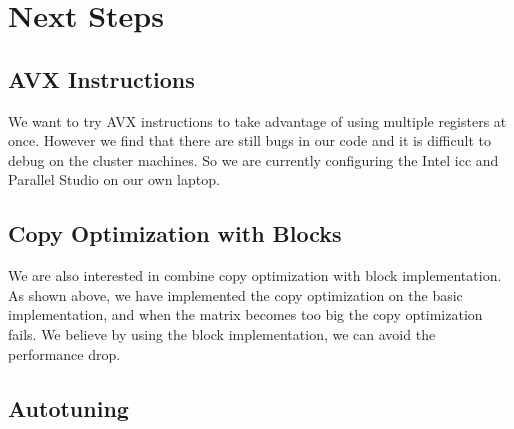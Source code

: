\documentclass[11pt]{article}
\theoremstyle{plain}
\theoremstyle{definition}
\begin{document}
\section{Next Steps}

\subsection{AVX Instructions}
We want to try AVX instructions to take advantage of using multiple registers at once. However we find that there are still bugs in our code and it is difficult to debug on the cluster machines. So we are currently configuring the Intel icc and Parallel Studio on our own laptop.

\subsection{Copy Optimization with Blocks}
We are also interested in combine copy optimization with block implementation. As shown above, we have implemented the copy optimization on the basic implementation, and when the matrix becomes too big the copy optimization fails. We believe by using the block implementation, we can avoid the performance drop.

\subsection{Autotuning}





 
 
\end{document}
